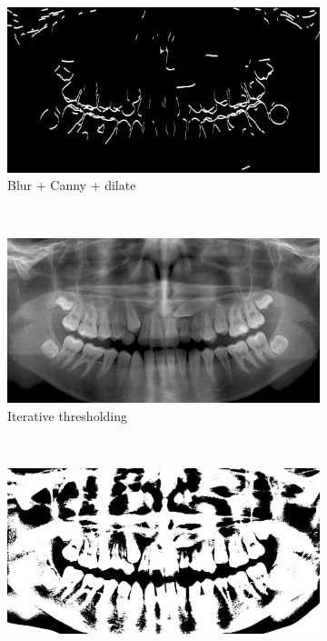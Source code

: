\documentclass[a4paper,10pt]{article}
\begin{document}
\begin{figure}[htbp]
	\centering
	\begin{subfigure}{0.45\textwidth}
		\centering
		\includegraphics[width=\textwidth, trim=20cm 5cm 20cm 10cm, clip]{dilate}
		\caption{Blur + Canny + dilate}
		\label{fig:dilate}
	\end{subfigure}
	~
	\begin{subfigure}{0.45\textwidth}
		\centering
		\includegraphics[width=\textwidth, trim=20cm 5cm 20cm 10cm, clip]{it_thresh}
		\caption{Iterative thresholding}
		\label{fig:it_thresh}
	\end{subfigure}
	\\
	\begin{subfigure}{0.45\textwidth}
		\centering
		\includegraphics[width=\textwidth, trim=20cm 5cm 20cm 10cm, clip]{ad_thresh}

\end{subfigure}
\end{figure}
\end{document}
